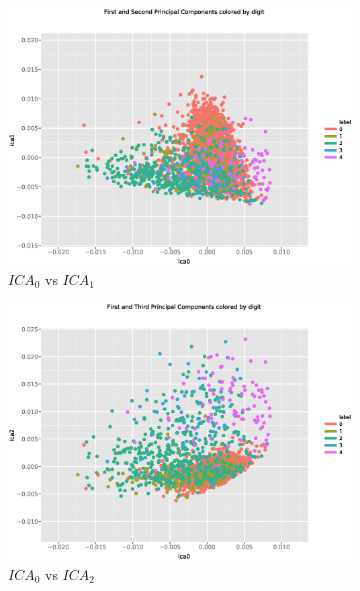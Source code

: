 \documentclass{llncs}
\begin{document}
\begin{figure}[h]
	\centering
	\begin{subfigure}[b]{0.32\textwidth}
		\centering
		\includegraphics[width=\textwidth]{./figures/ica0vsica1.eps}
		\caption{$ICA_0$ vs $ICA_1$}	
	\end{subfigure}
	\hfill    
	\begin{subfigure}[b]{0.32\textwidth}
		\centering
		\includegraphics[width=\textwidth]{./figures/ica0vsica2.eps}
		\caption{$ICA_0$ vs $ICA_2$}
	\end{subfigure}
	\hfill 
	\begin{subfigure}[b]{0.32\textwidth}
		\centering

\end{subfigure}
\end{figure}
\end{document}
